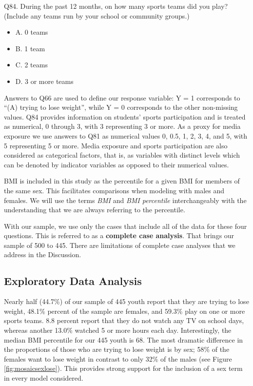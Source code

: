 \documentclass[
]{krantz}
\providecommand{\tightlist}{%
  \setlength{\itemsep}{0pt}\setlength{\parskip}{0pt}}
\begin{document}
Q84. During the past 12 months, on how many sports teams did you play? (Include any teams run by your school or community groups.)

\begin{itemize}
\tightlist
\item
  A. 0 teams
\item
  B. 1 team
\item
  C. 2 teams
\item
  D. 3 or more teams
\end{itemize}

Answers to Q66 are used to define our response variable: Y = 1 corresponds to ``(A) trying to lose weight'', while Y = 0 corresponds to the other non-missing values. Q84 provides information on students' sports participation and is treated as numerical, 0 through 3, with 3 representing 3 or more. As a proxy for media exposure we use answers to Q81 as numerical values 0, 0.5, 1, 2, 3, 4, and 5, with 5 representing 5 or more. Media exposure and sports participation are also considered as categorical factors, that is, as variables with distinct levels which can be denoted by indicator variables as opposed to their numerical values.

BMI is included in this study as the percentile for a given BMI for members of the same sex. This facilitates comparisons when modeling with males and females. We will use the terms \emph{BMI} and \emph{BMI percentile} interchangeably with the understanding that we are always referring to the percentile.

With our sample, we use only the cases that include all of the data for these four questions. This is referred to as a \textbf{complete case analysis}. That brings our sample of 500 to 445. There are limitations of complete case analyses that we address in the Discussion.

\hypertarget{exploratory-data-analysis-2}{%
\subsection{Exploratory Data Analysis}\label{exploratory-data-analysis-2}}

Nearly half (44.7\%) of our sample of 445 youth report that they are trying to lose weight, 48.1\% percent of the sample are females, and 59.3\% play on one or more sports teams. 8.8 percent report that they do not watch any TV on school days, whereas another 13.0\% watched 5 or more hours each day. Interestingly, the median BMI percentile for our 445 youth is 68. The most dramatic difference in the proportions of those who are trying to lose weight is by sex; 58\% of the females want to lose weight in contrast to only 32\% of the males (see Figure \ref{fig:mosaicsexlose}). This provides strong support for the inclusion of a sex term in every model considered.
\end{document}
